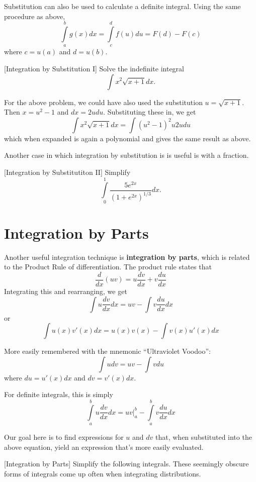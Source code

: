 \documentclass[]{book}
\theoremstyle{definition}
\theoremstyle{definition}
\theoremstyle{definition}
\theoremstyle{remark}
\begin{document}
Substitution can also be used to calculate a definite integral. Using the same procedure as above, \[\int\limits_a^b g(x)dx=\int\limits_c^d f(u)du = F(d)-F(c)\]
where \(c=u(a)\) and \(d=u(b)\).

[Integration by Substitution I]
\protect\hypertarget{exm:intsub1}{}{\label{exm:intsub1} {} }
Solve the indefinite integral \[\int x^2 \sqrt{x+1}dx.\]

For the above problem, we could have also used the substitution \(u=\sqrt{x+1}\). Then \(x=u^2-1\) and \(dx=2u du\). Substituting these in, we get \[\int x^2\sqrt{x+1}dx=\int (u^2-1)^2 u 2u du\] which when expanded is again a polynomial and gives the same result as above.

Another case in which integration by substitution is is useful is with a fraction.

[Integration by Substitutiton II]
\protect\hypertarget{exm:intsub2}{}{\label{exm:intsub2} {} }Simplify \[\int\limits_0^1 \frac{5e^{2x}}{(1+e^{2x})^{1/3}}dx.\]

\hypertarget{integration-by-parts}{%
\section{Integration by Parts}\label{integration-by-parts}}

Another useful integration technique is \textbf{integration by parts}, which is related to the Product Rule of differentiation. The product rule states that \[\frac{d}{dx}(uv)=u\frac{dv}{dx}+v\frac{du}{dx}\] Integrating this and rearranging, we get \[\int u\frac{dv}{dx}dx= u v - \int v \frac{du}{dx}dx\] or \[\int u(x) v'(x)dx=u(x)v(x) - \int v(x)u'(x)dx\]

More easily remembered with the mnemonic ``Ultraviolet Voodoo'': \[\int u dv = u v - \int v du\] where \(du=u'(x)dx\) and \(dv=v'(x)dx\).

For definite integrals, this is simply
\[\int\limits_a^b u\frac{dv}{dx}dx = \left. u v \right|_a^b - \int\limits_a^b v \frac{du}{dx}dx\]

Our goal here is to find expressions for \(u\) and \(dv\) that, when substituted into the above equation, yield an expression that's more easily evaluated.

[Integration by Parts]
\protect\hypertarget{exm:unnamed-chunk-31}{}{\label{exm:unnamed-chunk-31} {} }Simplify the following integrals. These seemingly obscure forms of integrals come up often when integrating distributions.
\end{document}
